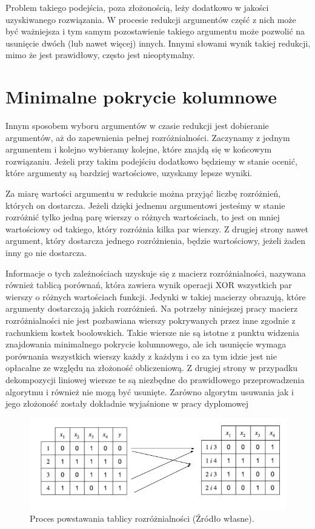Problem takiego podejścia,
poza złożonością,
leży dodatkowo w jakości uzyskiwanego rozwiązania.
W procesie redukcji argumentów część z nich może być ważniejsza
i tym samym pozostawienie takiego argumentu może pozwolić na usunięcie dwóch (lub nawet więcej) innych.
Innymi słowami wynik takiej redukcji,
mimo że jest prawidłowy,
często jest nieoptymalny.

\section{Minimalne pokrycie kolumnowe}

Innym sposobem wyboru argumentów w czasie redukcji jest dobieranie argumentów,
aż do zapewnienia pełnej rozróżnialności.
Zaczynamy z jednym argumentem i kolejno wybieramy kolejne,
które znajdą się w końcowym rozwiązaniu.
Jeżeli przy takim podejściu dodatkowo będziemy w stanie ocenić,
które argumenty są bardziej wartościowe,
uzyskamy lepsze wyniki.

Za miarę wartości argumentu w redukcie można przyjąć liczbę rozróżnień,
których on dostarcza.
Jeżeli dzięki jednemu argumentowi jesteśmy w stanie rozróżnić tylko jedną parę wierszy o różnych wartościach,
to jest on mniej wartościowy od takiego,
który rozróżnia kilka par wierszy.
Z drugiej strony nawet argument,
który dostarcza jednego rozróżnienia,
będzie wartościowy,
jeżeli żaden inny go nie dostarcza.

Informacje o tych zależnościach uzyskuje się z macierz rozróżnialności, nazywana również tablicą porównań,
która zawiera wynik operacji XOR wszystkich par wierszy o różnych wartościach funkcji.
Jedynki w takiej macierzy obrazują,
które argumenty dostarczają jakich rozróżnień.
Na potrzeby niniejszej pracy macierz rozróżnialności nie jest pozbawiana wierszy pokrywanych przez inne zgodnie z rachunkiem kostek boolowskich.
Takie wiersze nie są istotne z punktu widzenia znajdowania minimalnego pokrycie kolumnowego,
ale ich usunięcie wymaga porównania wszystkich wierszy każdy z każdym
i co za tym idzie jest nie opłacalne ze względu na złożoność obliczeniową.
Z drugiej strony w przypadku dekompozycji liniowej wiersze te są niezbędne do prawidłowego przeprowadzenia algorytmu i również nie mogą być usunięte.
Zarówno algorytm usuwania jak i jego złożoność zostały dokładnie wyjaśnione w pracy dyplomowej \cite{inzynierka}

\begin{figure}[H]
\centering
\includegraphics[width = 13cm]{chapter02/discernibility-table.png}
\caption{Proces powstawania tablicy rozróżnialności (Źródło własne).}
\end{figure}

